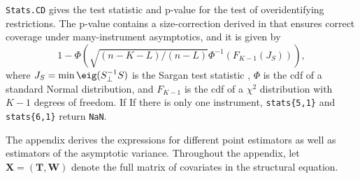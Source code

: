 \documentclass{mynotes}
\newcommand{\bx}{\mathbf{X}} %
\newcommand{\bt}{\mathbf{T}} %
\newcommand{\bw}{\mathbf{W}} %
\begin{document}
\lstinline!Stats.CD! gives the test statistic and p-value
for the \citet{cd93} test of overidentifying restrictions. The p-value contains
a size-correction derived in \citet{kolesar12re} that ensures correct coverage
under many-instrument asymptotics, and it is given by
\begin{equation*}
  1-\Phi(\sqrt{(n-K-L)/(n-L)}\Phi^{-1}(F_{K-1}(J_{S}))),
\end{equation*}
where $J_{S}=\min\eig(S_{\perp}^{-1}S)$ is the Sargan test statistic , $\Phi$ is
the cdf of a standard Normal distribution, and $F_{K-1}$ is the cdf of a
$\chi^{2}$ distribution with $K-1$ degrees of freedom. If If there is only one
instrument, \lstinline!stats{5,1}! and \lstinline!stats{6,1}! return
\lstinline!NaN!.


\begin{appendices}
  The appendix derives the expressions for different point estimators as well as
  estimators of the asymptotic variance. Throughout the appendix, let
  $\bx=(\bt,\bw)$ denote the full matrix of covariates in the structural
  equation.


\end{appendices}
\end{document}
